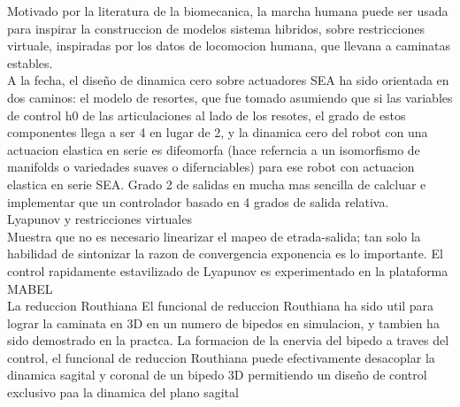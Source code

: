\documentclass[10pt,onecolumn,twoside,letterpaper]{article}
\begin{document}
Motivado por la literatura de la biomecanica, la marcha humana puede ser usada para inspirar la construccion de modelos sistema hibridos, sobre restricciones virtuale, inspiradas por los datos de locomocion humana, que llevana a caminatas estables.\\
A la fecha, el dise\~no de dinamica cero sobre actuadores SEA ha sido orientada en dos caminos: el modelo de resortes, que fue tomado asumiendo que si las variables de control h0 de las articulaciones al lado de los resotes, el grado de estos componentes llega a ser 4 en lugar de 2, y la dinamica cero del robot con una actuacion elastica en serie es difeomorfa (hace referncia a un isomorfismo de manifolds o variedades suaves o difernciables) para ese robot con actuacion elastica en serie SEA. Grado 2 de salidas en mucha mas sencilla de calcluar e implementar que un controlador basado en 4 grados de salida relativa.\cite{Grizzle2014}\\
Lyapunov y restricciones virtuales\\
Muestra que no es necesario linearizar el mapeo de etrada-salida; tan solo la habilidad de sintonizar la razon de convergencia exponencia es lo importante. El control rapidamente estavilizado de Lyapunov es experimentado en la plataforma MABEL\\
La reduccion Routhiana
El funcional de reduccion Routhiana ha sido util para lograr la caminata en 3D en un numero de bipedos en simulacion, y tambien ha sido demostrado en la practca. La formacion de la enervia del bipedo a traves del control, el funcional de reduccion Routhiana puede efectivamente desacoplar la dinamica sagital y coronal de un bipedo 3D permitiendo un dise\~no de control exclusivo paa la dinamica del plano sagital\cite{Grizzle2014}\\
\end{document}
